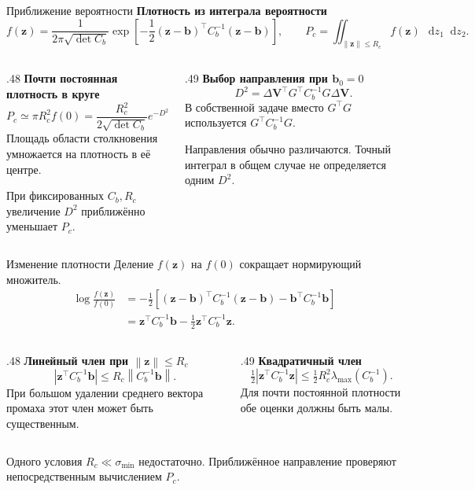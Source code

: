 \documentclass[11pt,aspectratio=169,t]{beamer}
\newcommand{\eqcompact}{\fontsize{10}{12}\selectfont}
\newcommand{\derivationmathspacing}{%
  \setlength{\abovedisplayskip}{2pt}%
  \setlength{\belowdisplayskip}{3pt}%
  \setlength{\abovedisplayshortskip}{2pt}%
  \setlength{\belowdisplayshortskip}{2pt}%
  \setlength{\jot}{2pt}}
\newcommand{\vect}[1]{\boldsymbol{#1}}
\newcommand{\norm}[1]{\left\lVert#1\right\rVert}
\newcommand{\dd}{\mathop{}\!\mathrm d}
\begin{document}
\begin{frame}{Приближение вероятности}
\relax\derivationmathspacing
\textbf{Плотность из интеграла вероятности}
{\eqcompact\derivationmathspacing
\[
 f(\vect z)=\frac{1}{2\pi\sqrt{\det C_b}}
 \exp\left[-\frac12(\vect z-\vect b)^\top C_b^{-1}(\vect z-\vect b)\right],
 \qquad
 P_c=\iint_{\norm{\vect z}\leqslant R_c}f(\vect z)\,\dd z_1\dd z_2.
\]
}
\begin{columns}[T,onlytextwidth]
\begin{column}{.48\textwidth}
\textbf{Почти постоянная плотность в круге}
{\eqcompact\derivationmathspacing
\[
 \boxed{P_c\simeq\pi R_c^2 f(0)
 =\frac{R_c^2}{2\sqrt{\det C_b}}e^{-D^2/2}.}
\]
}
Площадь области столкновения умножается на плотность в её центре.
\par\smallskip
При фиксированных $C_b,R_c$ увеличение $D^2$ приближённо уменьшает $P_c$.
\end{column}
\begin{column}{.49\textwidth}
\textbf{Выбор направления при $\vect b_0=0$}
{\eqcompact\derivationmathspacing
\[
 D^2=\Delta\vect V^\top G^\top C_b^{-1}G\Delta\vect V.
\]
}
В собственной задаче вместо $G^\top G$ используется $G^\top C_b^{-1}G$.
\par\smallskip
Направления обычно различаются. Точный интеграл в общем случае не определяется одним $D^2$.
\end{column}
\end{columns}
\end{frame}

\begin{frame}{Изменение плотности}
\relax\derivationmathspacing
Деление $f(\vect z)$ на $f(0)$ сокращает нормирующий множитель.
{\eqcompact\derivationmathspacing
\[
 \begin{aligned}
 \log\frac{f(\vect z)}{f(0)}
 &=-\frac12\left[(\vect z-\vect b)^\top C_b^{-1}(\vect z-\vect b)
                         -\vect b^\top C_b^{-1}\vect b\right]\\
 &=\vect z^\top C_b^{-1}\vect b-\frac12\vect z^\top C_b^{-1}\vect z.
 \end{aligned}
\]
}
\begin{columns}[T,onlytextwidth]
\begin{column}{.48\textwidth}
\textbf{Линейный член при $\norm{\vect z}\leqslant R_c$}
{\eqcompact\derivationmathspacing
\[
 |\vect z^\top C_b^{-1}\vect b|
 \leqslant R_c\norm{C_b^{-1}\vect b}.
\]
}
При большом удалении среднего вектора промаха этот член может быть существенным.
\end{column}
\begin{column}{.49\textwidth}
\textbf{Квадратичный член}
{\eqcompact\derivationmathspacing
\[
 \tfrac12|\vect z^\top C_b^{-1}\vect z|
 \leqslant\tfrac12R_c^2\lambda_{\max}(C_b^{-1}).
\]
}
Для почти постоянной плотности обе оценки должны быть малы.
\end{column}
\end{columns}
\smallskip
Одного условия $R_c\ll\sigma_{\min}$ недостаточно. Приближённое направление проверяют непосредственным вычислением $P_c$.
\end{frame}
\end{document}

